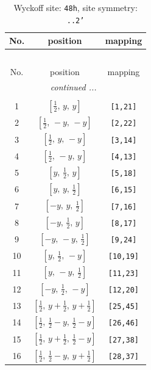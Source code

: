 \documentclass[fleqn,8pt]{jsarticle}
\begin{document}
\begin{longtable}{ccc}
\caption{Wyckoff site: {\tt 48h}, site symmetry: {\tt ..2'}}
 \\
 \hline \hline
No. & position & mapping \\ \hline \endfirsthead

\multicolumn{2}{l}{\tablename\ \thetable{}} \\
 \hline \hline
No. & position & mapping \\ \hline \endhead

 \hline \hline
\multicolumn{2}{r}{\footnotesize\it continued ...} \\ \endfoot

 \hline \hline
\multicolumn{2}{r}{} \\ \endlastfoot

1 & $\left[ \frac{1}{2},\, y,\, y \right]$ & {\tt [1,21]} \\ \hline
2 & $\left[ \frac{1}{2},\, - y,\, - y \right]$ & {\tt [2,22]} \\ \hline
3 & $\left[ \frac{1}{2},\, y,\, - y \right]$ & {\tt [3,14]} \\ \hline
4 & $\left[ \frac{1}{2},\, - y,\, y \right]$ & {\tt [4,13]} \\ \hline
5 & $\left[ y,\, \frac{1}{2},\, y \right]$ & {\tt [5,18]} \\ \hline
6 & $\left[ y,\, y,\, \frac{1}{2} \right]$ & {\tt [6,15]} \\ \hline
7 & $\left[ - y,\, y,\, \frac{1}{2} \right]$ & {\tt [7,16]} \\ \hline
8 & $\left[ - y,\, \frac{1}{2},\, y \right]$ & {\tt [8,17]} \\ \hline
9 & $\left[ - y,\, - y,\, \frac{1}{2} \right]$ & {\tt [9,24]} \\ \hline
10 & $\left[ y,\, \frac{1}{2},\, - y \right]$ & {\tt [10,19]} \\ \hline
11 & $\left[ y,\, - y,\, \frac{1}{2} \right]$ & {\tt [11,23]} \\ \hline
12 & $\left[ - y,\, \frac{1}{2},\, - y \right]$ & {\tt [12,20]} \\ \hline
13 & $\left[ \frac{1}{2},\, y + \frac{1}{2},\, y + \frac{1}{2} \right]$ & {\tt [25,45]} \\ \hline
14 & $\left[ \frac{1}{2},\, \frac{1}{2} - y,\, \frac{1}{2} - y \right]$ & {\tt [26,46]} \\ \hline
15 & $\left[ \frac{1}{2},\, y + \frac{1}{2},\, \frac{1}{2} - y \right]$ & {\tt [27,38]} \\ \hline
16 & $\left[ \frac{1}{2},\, \frac{1}{2} - y,\, y + \frac{1}{2} \right]$ & {\tt [28,37]} \\ \hline

\end{longtable}
\end{document}
